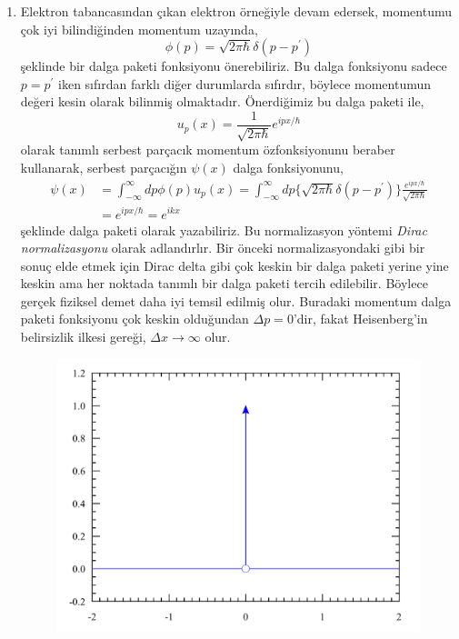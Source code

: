 \documentclass[a4paper,12pt, twoside]{article}
\begin{document}
\begin{enumerate}
	
	\item Elektron tabancasından çıkan elektron örneğiyle devam edersek, momentumu çok iyi bilindiğinden momentum uzayında,
	\begin{equation}
	\phi ( p ) = \sqrt { 2 \pi \hbar } \delta ( p - p^\prime )
	\end{equation}
	şeklinde bir dalga paketi fonksiyonu önerebiliriz. Bu dalga fonksiyonu sadece $p=p^\prime$ iken sıfırdan farklı diğer durumlarda sıfırdır, böylece momentumun değeri kesin olarak bilinmiş olmaktadır.
	Önerdiğimiz bu dalga paketi ile,
	\begin{equation}
	u _ { p } ( x ) = \frac { 1 } { \sqrt { 2 \pi \hbar } } e ^ { i p x / \hbar }
	\label{eq:free_particle_wf}
	\end{equation}
	olarak tanımlı serbest parçacık momentum özfonksiyonunu beraber kullanarak, serbest parçacığın $\psi(x)$ dalga fonksiyonunu,
	\begin{align}
	\psi ( x )  
	&= \int _ { - \infty } ^ { \infty } d p \phi ( p ) u_p(x)
	= \int _ { - \infty } ^ { \infty } d p  \{\sqrt { 2 \pi \hbar } \delta ( p - p^\prime )\} \frac { e ^ { i p x /\hbar } } { \sqrt { 2 \pi \hbar } }\\
	&= e ^ { i p x /\hbar } =  e ^ { i k x }
	\end{align}
	şeklinde dalga paketi olarak yazabiliriz. Bu normalizasyon yöntemi \emph{Dirac normalizasyonu} olarak adlandırlır. Bir önceki normalizasyondaki gibi bir sonuç elde etmek için Dirac delta gibi çok keskin bir dalga paketi yerine yine keskin ama her noktada tanımlı bir dalga paketi tercih edilebilir. Böylece gerçek fiziksel demet daha iyi temsil edilmiş olur. Buradaki momentum dalga paketi fonksiyonu çok keskin olduğundan $\Delta p = 0$'dir, fakat Heisenberg'in belirsizlik ilkesi gereği, $\Delta x \rightarrow \infty$ olur.
	\begin{figure}[hbtp]	
	\begin{minipage}{.45\textwidth}
	\centering
	\includegraphics[width=.9\linewidth]{Dirac_distribution_PDF.pdf}

\end{minipage}
\end{figure}
\end{enumerate}
\end{document}
